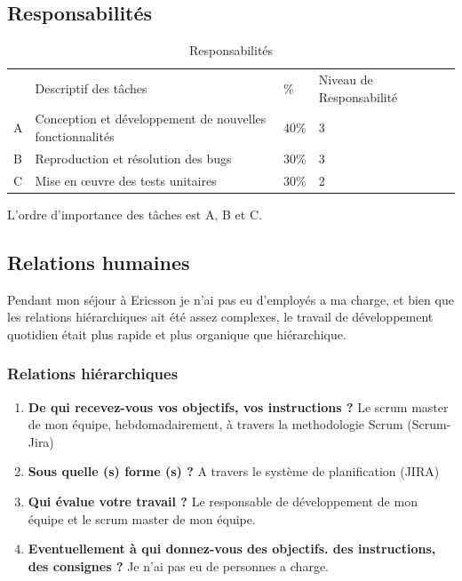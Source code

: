 \documentclass{resume} %
\begin{document}
\subsection{Responsabilités}
	
	
\begin{table}[!htbp]
\label{my-label}
\begin{tabular}{|l|l|l|l|l}
\cline{1-4}
   & Descriptif des tâches &  \% & Niveau de Responsabilité \footnotemark  &  \\ \cline{1-4}  
A & Conception et développement de nouvelles fonctionnalités & 40\% &3 & \\ \cline {1-4}
B & Reproduction et résolution des bugs & 30\% & 3  & \\ \cline {1-4}
C & Mise en œuvre des tests unitaires & 30\% &2   & \\ \cline {1-4}
\end{tabular}
\caption{Responsabilités}
\end{table}

L'ordre d'importance des tâches est A, B et C.


\subsection{Relations humaines}
	
	
	Pendant mon séjour à Ericsson je n'ai pas eu d'employés a ma charge, et bien que les relations hiérarchiques ait \'et\'e assez complexes, le travail de développement quotidien était plus rapide et plus organique que hiérarchique.

	\subsubsection {Relations hiérarchiques}
		\begin{enumerate}
		\item \textbf{De qui recevez-vous vos objectifs, vos instructions ?}
			Le scrum master de mon équipe, hebdomadairement, \`a travers la methodologie Scrum (Scrum-Jira)
		\item \textbf{Sous quelle (s) forme (s) ?}
			A travers le système de planification (JIRA) 
		\item \textbf{Qui évalue votre travail ?}
			Le responsable de développement de mon équipe et le scrum master de mon équipe.
		\item  \textbf{Eventuellement à qui donnez-vous des objectifs. des instructions, des consignes ?}
			Je n'ai pas eu de personnes a charge.
		\end{enumerate}
\end{document}
